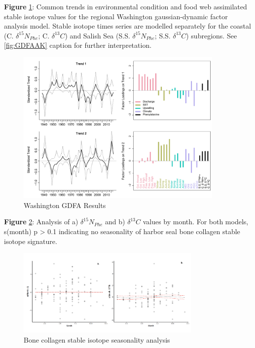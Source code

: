 \documentclass [11pt, proquest] {uwthesis}[2015/03/03]
\begin{document}
\textbf{Figure} \ref{fig:GDFAWA}: Common trends in environmental
condition and food web assimilated stable isotope values for the
regional Washington gaussian-dynamic factor analysis model. Stable
isotope times series are modelled separately for the coastal (C.
\(\delta^{15}N_{Phe}\); C. \(\delta^{13}C\)) and Salish Sea (S.S.
\(\delta^{15}N_{Phe}\); S.S. \(\delta^{13}C\)) subregions. See
\ref{fig:GDFAAK} caption for further interpretation.\\
\newline 
\begin{figure}[h]
\centering
  \includegraphics[width=0.9\textwidth]{figure/Ch2/Figure7_WA.GDFA.pdf}
  \caption{Washington GDFA Results}
  \label{fig:GDFAWA}
\end{figure}
\clearpage

\textbf{Figure} \ref{fig:Month}: Analysis of a) \(\delta^{15}N_{Phe}\)
and b) \(\delta^{13}C\) values by month. For both models, s(month) p
\textgreater{} 0.1 indicating no seasonality of harbor seal bone
collagen stable isotope signature.\\
\newline 
\begin{figure}[h]
  \centering
  \includegraphics[width=0.8\textwidth]{figure/Ch2/figures2.png}
  \caption{Bone collagen stable isotope seasonality analysis}
  \label{fig:Month}
\end{figure}
\clearpage
\end{document}
